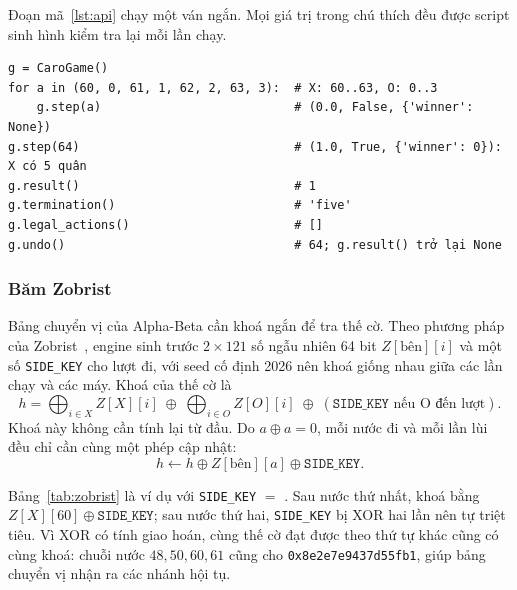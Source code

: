 Đoạn mã~\ref{lst:api} chạy một ván ngắn. Mọi giá trị trong chú thích đều được script sinh hình kiểm tra lại mỗi lần chạy.

\noindent\begin{minipage}{\linewidth}
\begin{lstlisting}[caption={Một ván X thắng bằng API của CaroGame.}, label={lst:api}, numbers=none]
g = CaroGame()
for a in (60, 0, 61, 1, 62, 2, 63, 3):  # X: 60..63, O: 0..3
    g.step(a)                           # (0.0, False, {'winner': None})
g.step(64)                              # (1.0, True, {'winner': 0}): X có 5 quân
g.result()                              # 1
g.termination()                         # 'five'
g.legal_actions()                       # []
g.undo()                                # 64; g.result() trở lại None
\end{lstlisting}
\end{minipage}

\subsubsection{Băm Zobrist}
Bảng chuyển vị của Alpha-Beta cần khoá ngắn để tra thế cờ. Theo phương pháp của Zobrist~\cite{zobrist1970}, engine sinh trước $2 \times 121$ số ngẫu nhiên 64 bit $Z[\text{bên}][i]$ và một số \texttt{SIDE\_KEY} cho lượt đi, với seed cố định 2026 nên khoá giống nhau giữa các lần chạy và các máy. Khoá của thế cờ là
\begin{equation}
  h = \bigoplus_{i \in X} Z[X][i] \;\oplus\; \bigoplus_{i \in O} Z[O][i] \;\oplus\; (\texttt{SIDE\_KEY} \text{ nếu O đến lượt}).
\end{equation}
Khoá này không cần tính lại từ đầu. Do $a \oplus a = 0$, mỗi nước đi và mỗi lần lùi đều chỉ cần cùng một phép cập nhật:
\begin{equation}
  h \leftarrow h \oplus Z[\text{bên}][a] \oplus \texttt{SIDE\_KEY}.
\end{equation}

Bảng~\ref{tab:zobrist} là ví dụ với \texttt{SIDE\_KEY} $=$ . Sau nước thứ nhất, khoá bằng $Z[X][60] \oplus \texttt{SIDE\_KEY}$; sau nước thứ hai, \texttt{SIDE\_KEY} bị XOR hai lần nên tự triệt tiêu. Vì XOR có tính giao hoán, cùng thế cờ đạt được theo thứ tự khác cũng có cùng khoá: chuỗi nước $48, 50, 60, 61$ cũng cho \texttt{0x8e2e7e9437d55fb1}, giúp bảng chuyển vị nhận ra các nhánh hội tụ.

\begin{table}[H]
  \centering\small
  \caption{Khoá Zobrist qua 4 nước $60, 61, 48, 50$.}
  \label{tab:zobrist}
  
\end{table}

